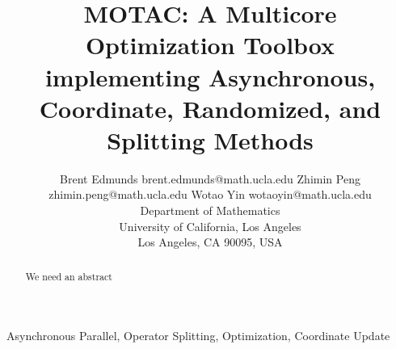 \documentclass[twoside,11pt]{article}
\newcommand{\pkg}{{MOTAC}}
\begin{document}
\title{\pkg: A Multicore Optimization Toolbox implementing Asynchronous, Coordinate, Randomized, and Splitting Methods}

\author{\name Brent Edmunds \email brent.edmunds@math.ucla.edu
       \AND
       \name Zhimin Peng \email zhimin.peng@math.ucla.edu
       \AND
        \name Wotao Yin \email wotaoyin@math.ucla.edu \\
       \addr Department of Mathematics\\
       University of California, Los Angeles\\
       Los Angeles, CA 90095, USA}      

\maketitle

\begin{abstract}
We need an abstract
\end{abstract}

\begin{keywords}
Asynchronous Parallel, Operator Splitting, Optimization, Coordinate Update
\end{keywords}








% 

%

%

%


% 


% 

% 

% 





\end{document}
